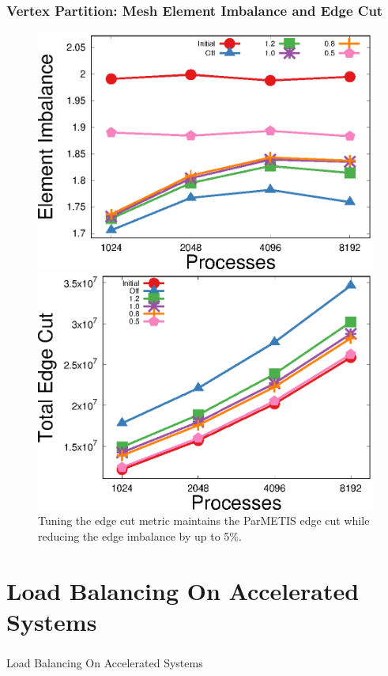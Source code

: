 \documentclass[aspectratio=169]{beamer}
\begin{document}
\begin{frame}
  \frametitle{Vertex Partition: Mesh Element Imbalance and Edge Cut}
  \begin{figure}
    \centering
    \includegraphics[width=.48\textwidth]{../accelerated_cse19/figures/eimb_v_cores.eps}
    \includegraphics[width=.48\textwidth]{../accelerated_cse19/figures/ecut_v_cores.eps}\\
    Tuning the edge cut metric maintains the ParMETIS edge cut while reducing the
    edge imbalance by up to 5\%.
  \end{figure}  
\end{frame}

\section{Load Balancing On Accelerated Systems}

\begin{frame}
  \frametitle{}
  \center \huge{Load Balancing On Accelerated Systems}
\end{frame}
\end{document}
